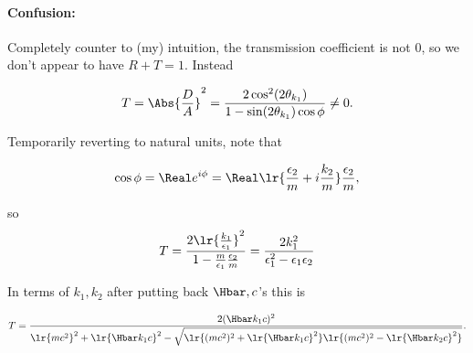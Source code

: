 \begin{enumerate}[(i)]
\paragraph{Confusion:}
Completely counter to (my) intuition, the transmission coefficient is not 0, so we don't appear to have \( R + T = 1 \).  Instead

\begin{dmath}\label{eqn:gradQuantumProblemSet4Problem3:1241}
T 
= \Abs{\frac{D}{A}}^2
=
\frac{2 \cos^2(2 \theta_{k_1})}
{
1 - \sin( 2 \theta_{k_1}) \cos \phi
}
\ne 0.
\end{dmath}


Temporarily reverting to natural units, note that

\begin{dmath}\label{eqn:gradQuantumProblemSet4Problem3:1261}
\cos\phi 
= \Real e^{i \phi}
= \Real \lr{ \frac{\epsilon_2}{m} + i \frac{k_2}{m} }
\frac{\epsilon_2}{m},
\end{dmath}

so
\begin{dmath}\label{eqn:gradQuantumProblemSet4Problem3:1281}
T 
= 
\frac{ 
   2 \lr{\frac{k_1}{\epsilon_1}}^2
}{
1 - \frac{m}{\epsilon_1} \frac{\epsilon_2}{m}
}
=
\frac{
   2 k_1^2
}{
\epsilon_1^2 - \epsilon_1 \epsilon_2
}
\end{dmath}

In terms of \(k_1, k_2 \) after putting back \( \Hbar, c \)'s this is

\begin{dmath}\label{eqn:gradQuantumProblemSet4Problem3:1301}
T
=
\frac{
   2 (\Hbar k_1 c)^2
}{
\lr{ m c^2 }^2 + \lr{ \Hbar k_1 c }^2 
- \sqrt{ 
\lr{(m c^2)^2 + \lr{ \Hbar k_1 c}^2 }
\lr{(m c^2)^2 - \lr{ \Hbar k_2 c}^2 }
}
}.
\end{dmath}

\end{enumerate}
